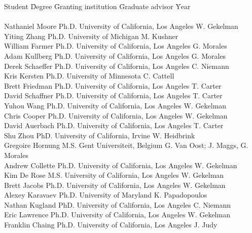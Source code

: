 \documentclass[11pt]{article}
\begin{document}
 \begin{tabbing}
Student \hspace{0.65in} \= Degree \hspace{0.1in} \= Granting institution \hspace{1.5in} \= Graduate advisor\hspace{0.3in} \= Year \\
\\
Nathaniel Moore  \> Ph.D. \>  University of California, Los Angeles \> W. Gekelman \\
Yiting Zhang \> Ph.D. \> University of Michigan \> M. Kushner \\
William Farmer	 \> Ph.D. \>  University of California, Los Angeles \> G. Morales \\
Adam Kullberg	 \> Ph.D. \>  University of California, Los Angeles \> G. Morales \\
Derek Schaeffer  \> Ph.D. \>  University of California, Los Angeles \> C. Niemann \\
Kris Kersten \> Ph.D. \> University of Minnesota \> C. Cattell \\
Brett Friedman \> Ph.D. \>  University of California, Los Angeles \> T. Carter \\
David Schaffner \> Ph.D. \>  University of California, Los Angeles \> T. Carter \\
Yuhou Wang  \> Ph.D. \>  University of California, Los Angeles \> W. Gekelman \\
Chris Cooper  \> Ph.D. \>  University of California, Los Angeles \> W. Gekelman \\
David Auerbach  \> Ph.D. \>  University of California, Los Angeles \> T. Carter \\
Shu Zhou \> PhD. \> University of California, Irvine \> W. Heidbrink
 \\
Gregoire Hornung \> M.S. \> Gent Universiteit, Belgium \> G. Van Oost;
J. Maggs, G. Morales  \\
Andrew Collette \> Ph.D. \>  University of California, Los Angeles \> W. Gekelman \\
Kim De Rose\> M.S. \>  University of California, Los Angeles \> W. Gekelman \\
Brett Jacobs \> Ph.D. \>  University of California, Los Angeles \> W. Gekelman \\
Alexey Karavaev \> Ph.D. \>  University of Maryland \> K. Papadopoulos \\
Nathan Kugland \> PhD. \> University of California, Los Angeles \> C. Niemann \\
Eric Lawrence \> Ph.D. \>  University of California, Los Angeles \>
W. Gekelman \\
Franklin Chaing \> Ph.D. \> University of California, Los Angeles \>
J. Judy
 \\
 \end{tabbing}
 
\end{document}
